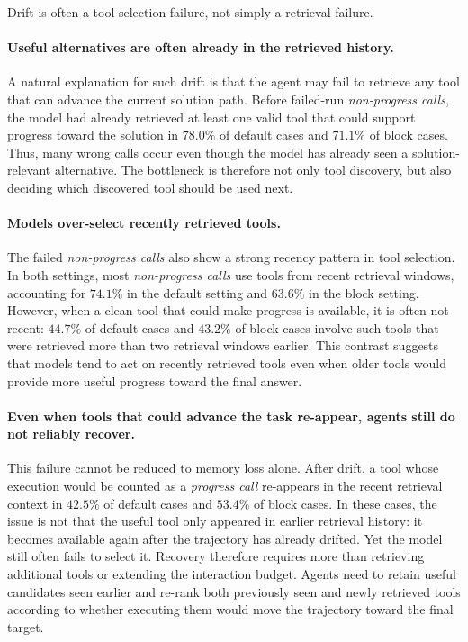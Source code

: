 \documentclass{llmxive}
\begin{document}
\begin{takeaway}
Drift is often a tool-selection failure, not simply a retrieval failure.
\end{takeaway}

\paragraph{Useful alternatives are often already in the retrieved history.}
A natural explanation for such drift is that the agent may fail to retrieve any tool that can advance the current solution path.
Before failed-run \textit{non-progress calls}, the model had already retrieved at least one valid tool that could support progress toward the solution in $78.0\%$ of default cases and $71.1\%$ of block cases.
Thus, many wrong calls occur even though the model has already seen a solution-relevant alternative.
The bottleneck is therefore not only tool discovery, but also deciding which discovered tool should be used next.

\paragraph{Models over-select recently retrieved tools.}
The failed \textit{non-progress calls} also show a strong recency pattern in tool selection.
In both settings, most \textit{non-progress calls} use tools from recent retrieval windows, accounting for $74.1\%$ in the default setting and $63.6\%$ in the block setting.
However, when a clean tool that could make progress is available, it is often not recent: $44.7\%$ of default cases and $43.2\%$ of block cases involve such tools that were retrieved more than two retrieval windows earlier.
This contrast suggests that models tend to act on recently retrieved tools even when older tools would provide more useful progress toward the final answer.

\paragraph{Even when tools that could advance the task re-appear, agents still do not reliably recover.}
This failure cannot be reduced to memory loss alone.
After drift, a tool whose execution would be counted as a \textit{progress call} re-appears in the recent retrieval context in $42.5\%$ of default cases and $53.4\%$ of block cases.
In these cases, the issue is not that the useful tool only appeared in earlier retrieval history: it becomes available again after the trajectory has already drifted.
Yet the model still often fails to select it.
Recovery therefore requires more than retrieving additional tools or extending the interaction budget.
Agents need to retain useful candidates seen earlier and re-rank both previously seen and newly retrieved tools according to whether executing them would move the trajectory toward the final target.
\end{document}
